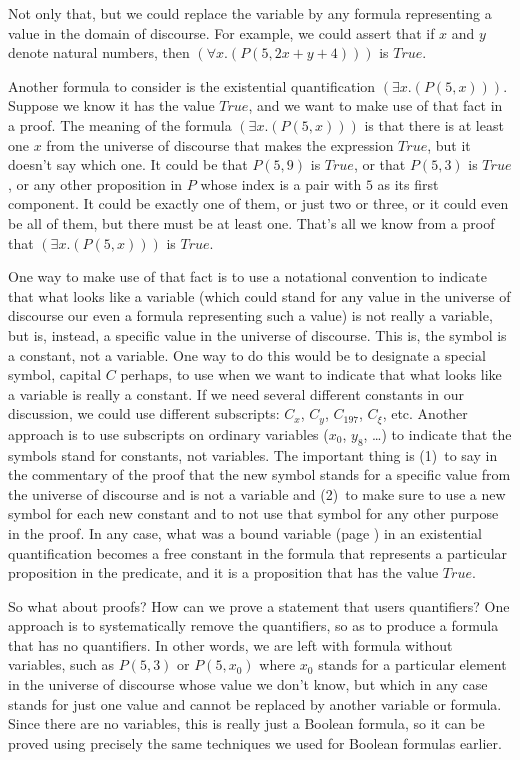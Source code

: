 {{Not only that, but we could replace the variable by any formula
representing a value in the domain of discourse.
For example, we could assert that if $x$ and $y$ denote natural numbers,
then $(\forall x.(P(5, 2x + y + 4)))$ is $True$.

Another formula to consider is the existential quantification $(\exists x.(P(5, x)))$.
Suppose we know it has the value $True$, and we want to make use of that fact in a proof.
The meaning of the formula $(\exists x.(P(5, x)))$ is that
there is at least one $x$ from the universe of discourse that makes the expression $True$,
but it doesn't say which one.
It could be that $P(5, 9)$ is $True$, or that $P(5, 3)$ is $True$,
or any other proposition in $P$ whose index is a pair with $5$ as its first component.
It could be exactly one of them,
or just two or three, or it could even be all of them, but
there must be at least one. That's all we know
from a proof that $(\exists x.(P(5, x)))$ is $True$.

One way to make use of that fact is to use a notational convention
to indicate that what looks like a variable (which could stand for any
value in the universe of discourse our even a formula representing such a value)
is not really a variable, but is, instead, a specific value in the universe of
discourse. This is, the symbol is a constant, not a variable.
One way to do this would be to designate a special symbol, capital $C$ perhaps,
to use when we want to indicate that what looks like a variable is really a constant.
\label{def:skolem-constant}
If we need several different constants in our discussion, we could use different
subscripts: $C_x$, $C_y$, $C_{197}$, $C_{\xi}$, etc.
Another approach is to use subscripts on ordinary variables ($x_0$, $y_8$, \dots)
to indicate that the symbols stand for constants, not variables.
The important thing is (1)~to say in the commentary of the proof that the new
symbol stands for a specific value from the universe of discourse and is not a variable
and (2)~to make sure to use a new symbol for each new constant and to not use that
symbol for any other purpose in the proof. In any case, what was a
bound variable (page \pageref{def:bound-variable}) in an existential quantification
becomes a free constant in the formula that represents a particular proposition in the
predicate, and it is a proposition that has the value $True$.

So what about proofs? How can we prove a statement that users quantifiers?
One approach is to systematically
remove the quantifiers, so as to produce a formula that has no quantifiers.
In other words, we
are left with formula without variables, such as $P(5,3)$ or $P(5,x_0)$ where
$x_0$ stands for a particular element in the universe of discourse whose value
we don't know, but which in any case stands for just one value and cannot
be replaced by another variable or formula.
Since there are no variables, this is really just a Boolean formula,
so it can be proved using precisely the same techniques we used for Boolean
formulas earlier.

}}
